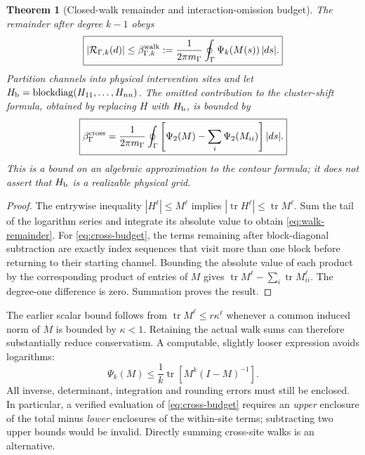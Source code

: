 \documentclass[11pt]{article}
\newtheorem{theorem}{Theorem}
\begin{document}
\begin{theorem}[Closed-walk remainder and interaction-omission budget]
The remainder after degree $k-1$ obeys
\begin{equation}
 \boxed{|\mathcal R_{\Gamma,k}(d)|\le
 \beta_{\Gamma,k}^{\rm walk}:=
 \frac{1}{2\pi m_\Gamma}
       \oint_\Gamma\Psi_k(M(s))\,|ds|.}
 \label{eq:walk-remainder}
\end{equation}
Partition channels into physical intervention sites and let
$H_{\rm b}=\operatorname{blockdiag}(H_{11},\ldots,H_{nn})$.
The omitted contribution to the cluster-shift formula, obtained by
replacing $H$ with $H_{\rm b}$, is bounded by
\begin{equation}
 \boxed{\beta_\Gamma^{\rm cross}=
 \frac{1}{2\pi m_\Gamma}\oint_\Gamma
 \left[\Psi_2(M)-\sum_i\Psi_2(M_{ii})\right]|ds|.}
 \label{eq:cross-budget}
\end{equation}
This is a bound on an algebraic approximation to the contour formula;
it does not assert that $H_{\rm b}$ is a realizable physical grid.
\end{theorem}
\begin{proof}
The entrywise inequality $|H^\ell|\le M^\ell$ implies
$|\operatorname{tr}H^\ell|\le\operatorname{tr}M^\ell$.
Sum the tail of the logarithm series and integrate its absolute value
to obtain \eqref{eq:walk-remainder}.
For \eqref{eq:cross-budget}, the terms remaining after block-diagonal
subtraction are exactly index sequences that visit more than one
block before returning to their starting channel. Bounding the
absolute value of each product by the corresponding product of
entries of $M$ gives
$\operatorname{tr}M^\ell-\sum_i\operatorname{tr}M_{ii}^\ell$.
The degree-one difference is zero. Summation proves the result.
\end{proof}

The earlier scalar bound follows from
$\operatorname{tr}M^\ell\le r\kappa^\ell$ whenever a common induced
norm of $M$ is bounded by $\kappa<1$. Retaining the actual walk sums
can therefore substantially reduce conservatism. A computable,
slightly looser expression avoids logarithms:
\[
 \Psi_k(M)\le\frac1k\operatorname{tr}\!\left[M^k(I-M)^{-1}\right].
\]
All inverse, determinant, integration and rounding errors must still
be enclosed. In particular, a verified evaluation of
\eqref{eq:cross-budget} requires an \emph{upper} enclosure of the
total minus \emph{lower} enclosures of the within-site terms;
subtracting two upper bounds would be invalid. Directly summing
cross-site walks is an alternative.
\end{document}

